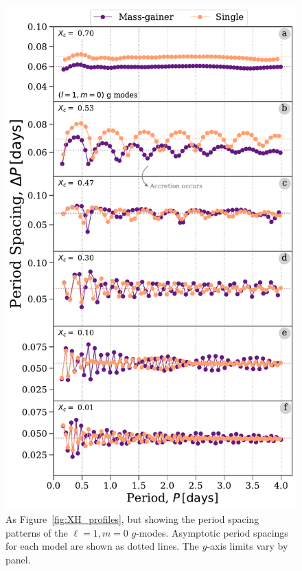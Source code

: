 \documentclass[twocolumn, twocolappendix, oneside]{aastex631}
\newcommand{\gmodes}{$g$-modes\xspace}
\begin{document}
\begin{figure}%
    \centering
    \includegraphics[width=\columnwidth]{figures/period_spacing_mdm20.pdf}
    \caption{As Figure~\ref{fig:XH_profiles}, but showing the period spacing patterns of the $\ell = 1, m = 0$ \gmodes. Asymptotic period spacings for each model are shown as dotted lines. The $y$-axis limits vary by panel.}
    \label{fig:period_spacing}
\end{figure}
\end{document}
